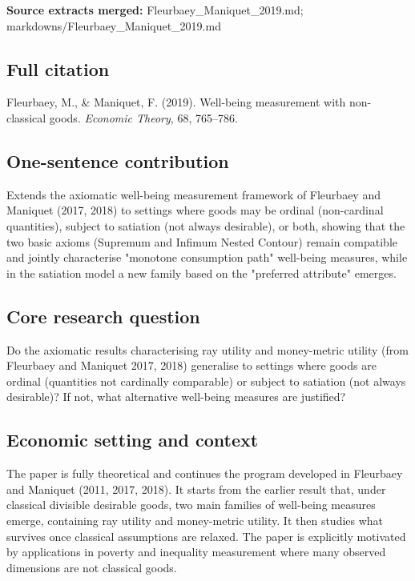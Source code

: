 \documentclass[11pt,a4paper]{article}
\begin{document}
\textbf{Source extracts merged:} Fleurbaey\_Maniquet\_2019.md; markdowns/Fleurbaey\_Maniquet\_2019.md

\subsection*{Full citation}
Fleurbaey, M., \& Maniquet, F. (2019). Well-being measurement with non-classical goods. \textit{Economic Theory}, 68, 765--786.

\subsection*{One-sentence contribution}
Extends the axiomatic well-being measurement framework of Fleurbaey and Maniquet (2017, 2018) to settings where goods may be ordinal (non-cardinal quantities), subject to satiation (not always desirable), or both, showing that the two basic axioms (Supremum and Infimum Nested Contour) remain compatible and jointly characterise "monotone consumption path" well-being measures, while in the satiation model a new family based on the "preferred attribute" emerges.

\subsection*{Core research question}
Do the axiomatic results characterising ray utility and money-metric utility (from Fleurbaey and Maniquet 2017, 2018) generalise to settings where goods are ordinal (quantities not cardinally comparable) or subject to satiation (not always desirable)? If not, what alternative well-being measures are justified?

\subsection*{Economic setting and context}
The paper is fully theoretical and continues the program developed in Fleurbaey and Maniquet (2011, 2017, 2018). It starts from the earlier result that, under classical divisible desirable goods, two main families of well-being measures emerge, containing ray utility and money-metric utility. It then studies what survives once classical assumptions are relaxed. The paper is explicitly motivated by applications in poverty and inequality measurement where many observed dimensions are not classical goods.
\end{document}
